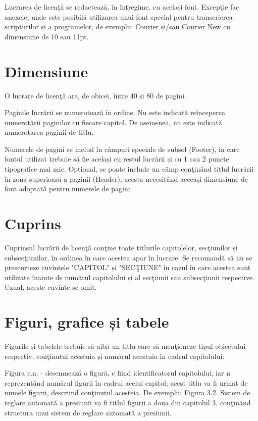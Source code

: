 Lucrarea de licenţă se redactează, în întregime, cu același font. Excepţie fac anexele, unde este posibilă utilizarea unui font special pentru transcrierea scripturilor și a programelor, de exemplu: Courier și/sau Courier New cu dimensiune de 10 sau 11pt.

\section{Dimensiune}

O lucrare de licenţă are, de obicei, între 40 și 80 de pagini.

Paginile lucrării se numerotează în ordine. Nu este indicată reînceperea numerotării paginilor cu fiecare capitol. De asemenea, nu este indicată numerotarea paginii de titlu.

Numerele de pagini se includ în câmpuri speciale de subsol (Footer), în care fontul utilizat trebuie să fie același cu restul lucrării și cu 1 sau 2 puncte tipografice mai mic. Optional, se poate include un câmp conţinând titlul lucrării în zona superioară a paginii (Header), acesta necesitând aceeași dimensiune de font adoptată pentru numerele de pagini.

\section{Cuprins}

Cuprinsul lucrării de licenţă conţine toate titlurile capitolelor, secţiunilor și subsecţiunilor, în ordinea în care acestea apar în lucrare. Se recomandă să nu se prescurteze cuvintele "CAPITOL" și "SECŢIUNE" în cazul în care acestea sunt utilizate înainte de numărul capitolului și al secţiunii sau subsecţiunii respective. Uzual, aceste cuvinte se omit.

\section{Figuri, grafice și tabele}

 Figurile și tabelele trebuie să aibă un titlu care să menţioneze tipul obiectului respectiv, conţinutul acestuia și numărul acestuia în cadrul capitolului:

	Figura c.n. - desemnează o figură, c fiind identificatorul capitolului, iar n reprezentând numărul figurii în cadrul acelui capitol; acest titlu va fi urmat de numele figurii, descriind conţinutul acesteia. De exemplu: Figura 3.2. Sistem de reglare automată a presiunii va fi titlul figurii a doua din capitolul 3, conţinând structura unui sistem de reglare automată a presiunii.

